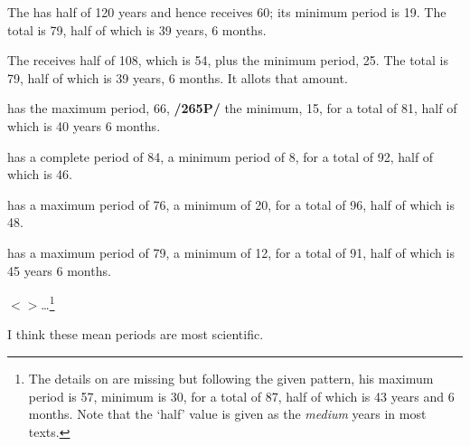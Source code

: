 The \Sun\xspace has half of 120 years and hence receives 60; its minimum period is 19. The total is 79, half of which is 39 years, 6 months.

The \Moon\xspace receives half of 108, which is 54, plus the minimum period, 25. The total is 79, half of which is 39 years, 6 months. It allots that amount. 

\Mars\xspace has the maximum period, 66, \textbf{/265P/} the minimum, 15, for a total of 81, half of which is 40 years 6 months.

\Venus\xspace has a complete period of 84, a minimum period of 8, for a total of 92, half of which is 46.

\Mercury\xspace has a maximum period of 76, a minimum of 20, for a total of 96, half of which is 48.

\Jupiter\xspace has a maximum period of 79, a minimum of 12, for a total of 91, half of which is 45 years 6 months.

$<$\Saturn$>$…\footnote{The details on \Saturn\xspace are missing but following the given pattern, his maximum period is 57, minimum is 30, for a total of 87, half of which is 43 years and 6 months. Note that the `half' value is given as the \textit{medium} years in most texts.}

I think these mean periods are most scientific.

\newpage